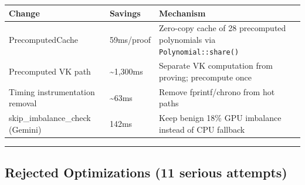 \documentclass[
]{article}
\newcounter{none} %
\begin{document}
{\def\LTcaptype{none} %
\begin{longtable}[]{@{}
  >{\raggedright\arraybackslash}p{}
  >{\raggedleft\arraybackslash}p{}
  >{\raggedright\arraybackslash}p{}@{}}
\toprule\noalign{}
\begin{minipage}[b]{\linewidth}\raggedright
Change
\end{minipage} & \begin{minipage}[b]{\linewidth}\raggedleft
Savings
\end{minipage} & \begin{minipage}[b]{\linewidth}\raggedright
Mechanism
\end{minipage} \\
\midrule\noalign{}
\endhead
\bottomrule\noalign{}
\endlastfoot
PrecomputedCache & 59ms/proof & Zero-copy cache of 28 precomputed
polynomials via \texttt{Polynomial::share()} \\
Precomputed VK path & \textasciitilde1,300ms & Separate VK computation
from proving; precompute once \\
Timing instrumentation removal & \textasciitilde63ms & Remove
fprintf/chrono from hot paths \\
skip\_imbalance\_check (Gemini) & 142ms & Keep benign 18\% GPU imbalance
instead of CPU fallback \\
\end{longtable}
}

\begin{center}\rule{0.5\linewidth}{0.5pt}\end{center}

\subsection{Rejected Optimizations (11 serious
attempts)}\label{rejected-optimizations-11-serious-attempts}
\end{document}
